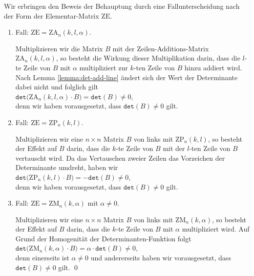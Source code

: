\proof
Wir erbringen den Beweis der Behauptung durch eine Fallunterscheidung nach der Form der Elementar-Matrix $\mathrm{ZE}$.
\begin{enumerate}
\item Fall: $\mathrm{ZE} = \mathrm{ZA}_n(k,l,\alpha)$. 
  
      Multiplizieren wir die Matrix $B$ mit der Zeilen-Additions-Matrix $\mathrm{ZA}_n(k,l,\alpha)$,
      so besteht die Wirkung dieser Multiplikation darin, dass die $l$-te Zeile von $B$  mit $\alpha$ multipliziert
      zur $k$-ten Zeile von $B$ hinzu addiert wird.  Nach Lemma \ref{lemma:det-add-line}
      \"andert sich der Wert der Determinante dabei nicht und folglich gilt
      \\[0.2cm]
      \hspace*{1.3cm}
      $\mathtt{det}\bigl(\mathrm{ZA}_n(k,l,\alpha) \cdot B\bigr) = \mathtt{det}(B) \not= 0$,
      \\[0.2cm]
      denn wir haben vorausgesetzt, dass $\mathtt{det}(B) \not= 0$ gilt.
\item Fall: $\mathrm{ZE} = \mathrm{ZP}_n(k,l)$.

      Multiplizieren wir eine $n \times n$ Matrix $B$ von links mit
      $\mathrm{ZP}_n(k,l)$, so besteht der Effekt auf $B$ darin, dass die $k$-te Zeile von $B$ mit der
      $l$-ten Zeile von $B$ vertauscht wird.
      Da das Vertauschen zweier Zeilen das Vorzeichen der Determinante umdreht, haben wir
      \\[0.2cm]
      \hspace*{1.3cm}
      $\mathtt{det}\bigl(\mathrm{ZP}_n(k,l) \cdot B\bigr) = -\mathtt{det}(B) \not= 0$,
      \\[0.2cm]
      denn wir haben vorausgesetzt, dass $\mathtt{det}(B) \not= 0$ gilt.
\item Fall: $\mathrm{ZE} = \mathrm{ZM}_n(k, \alpha)$ \quad mit $\alpha \not= 0$.

      Multiplizieren wir eine $n \times n$ Matrix $B$ von links mit
      $\textrm{ZM}_n(k,\alpha)$, so besteht der Effekt auf $B$ darin, dass die $k$-te Zeile von $B$
      mit $\alpha$ multipliziert wird.
      Auf Grund der Homogenit\"at der Determinanten-Funktion folgt
      \\[0.2cm]
      \hspace*{1.3cm}
      $\mathtt{det}\bigl(\mathrm{ZM}_n(k,\alpha) \cdot B) = \alpha \cdot \mathtt{det}(B) \not= 0$,
      \\[0.2cm]
      denn einerseits ist $\alpha \not= 0$ und andererseits       
      haben wir vorausgesetzt, dass $\mathtt{det}(B) \not= 0$ gilt. \qed
\end{enumerate}


